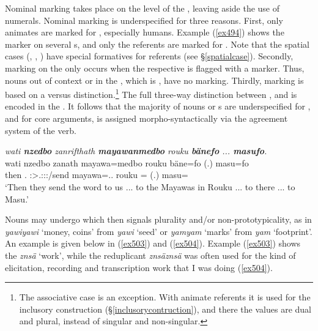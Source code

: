 Nominal  marking takes place on the level of the , leaving aside the use of numerals. Nominal  marking is underspecified for three reasons. First, only animates are marked for , especially humans. Example (\ref{ex494}) shows the   marker on several s, and only the  referents are marked for . Note that the spatial cases (, , ) have special formatives for  referents (see \S{}\ref{spatialcase}). Secondly,  marking on the  only occurs when the respective  is flagged with a  marker. Thus, nouns out of context or  in the  , which is , have no   marking. Thirdly,   marking is based on a  versus  distinction.\footnote{The associative case is an exception. With animate referents it is used for the inclusory construction (\S{}\ref{inclusorycontruction}), and there the values are dual and plural, instead of singular and non-singular.} The full three-way distinction between ,  and  is encoded in the . It follows that the majority of nouns or s are underspecified for , and for core  arguments,  is assigned morpho-syntactically via the agreement system of the verb.

\begin{exe}
	\ex \emph{wati \textbf{nzedbo} zanrifthath \textbf{mayawanmedbo} rouku \textbf{bänefo} ... \textbf{masufo}.}\\
	\gll wati nzedbo zanath mayawa=medbo rouku bäne=fo (.) masu=fo\\
	then \Fnsg.\All{} \Stpl:\Sbj>\Tsg.\F:\Obj:\Pst:\Pfv/send mayawa=\All.\Anim.\Nsg{} rouku \Recog=\All{} (.) masu=\All{}\\
	\trans `Then they send the word to us ... to the Mayawas in Rouku ... to there ... to Masu.' 
	\label{ex494}
\end{exe}

Nouns may undergo  which then signals plurality and/or non-prototypicality, as in \emph{yawiyawi} `money, coins' from \emph{yawi} `seed' or \emph{yamyam} `marks' from \emph{yam} `footprint'. An example is given below in (\ref{ex503}) and (\ref{ex504}). Example (\ref{ex503}) shows the  \emph{znsä} `work', while the reduplicant \emph{znsäznsä} was often used for the kind of elicitation, recording and transcription work that I was doing (\ref{ex504}).

